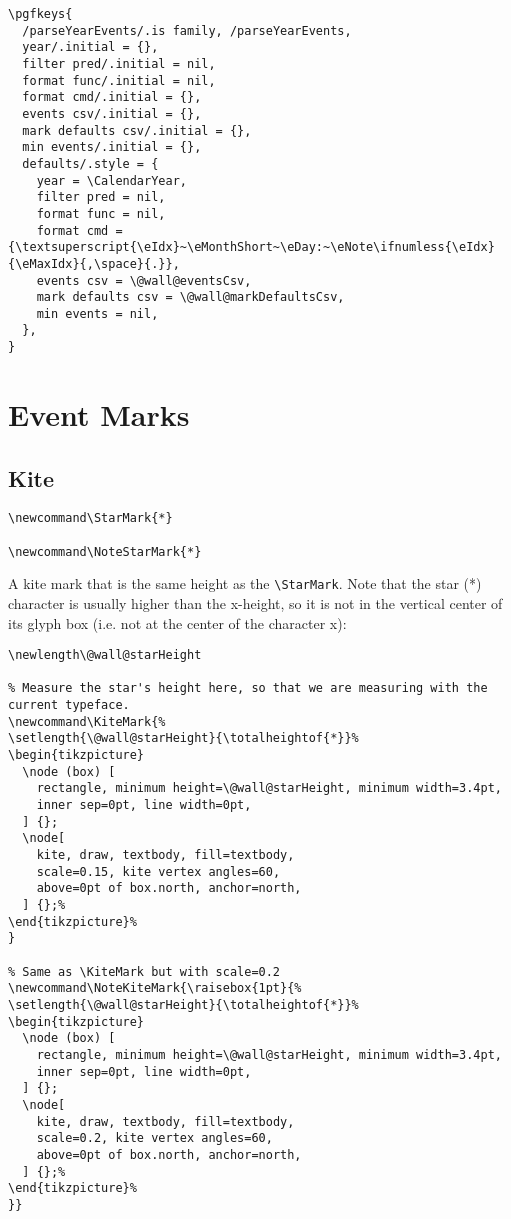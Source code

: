 \documentclass[11pt,oneside]{memoir-article}
\begin{document}
\begin{verbatim}
\pgfkeys{
  /parseYearEvents/.is family, /parseYearEvents,
  year/.initial = {},
  filter pred/.initial = nil,
  format func/.initial = nil,
  format cmd/.initial = {},
  events csv/.initial = {},
  mark defaults csv/.initial = {},
  min events/.initial = {},
  defaults/.style = {
    year = \CalendarYear,
    filter pred = nil,
    format func = nil,
    format cmd = {\textsuperscript{\eIdx}~\eMonthShort~\eDay:~\eNote\ifnumless{\eIdx}{\eMaxIdx}{,\space}{.}},
    events csv = \@wall@eventsCsv,
    mark defaults csv = \@wall@markDefaultsCsv,
    min events = nil,
  },
}
\end{verbatim}

\chapter{Event Marks}
\label{sec-8}
\section{Kite}
\label{sec-8-1}

\begin{verbatim}
\newcommand\StarMark{*}

\newcommand\NoteStarMark{*}
\end{verbatim}

A kite mark that is the same height as the \texttt{\textbackslash{}StarMark}. Note that the star (*)
character is usually higher than the x-height, so it is not in the vertical
center of its glyph box (i.e. not at the center of the character x):

 \frame{*}

\begin{verbatim}
\newlength\@wall@starHeight

% Measure the star's height here, so that we are measuring with the current typeface.
\newcommand\KiteMark{%
\setlength{\@wall@starHeight}{\totalheightof{*}}%
\begin{tikzpicture}
  \node (box) [
    rectangle, minimum height=\@wall@starHeight, minimum width=3.4pt,
    inner sep=0pt, line width=0pt,
  ] {};
  \node[
    kite, draw, textbody, fill=textbody,
    scale=0.15, kite vertex angles=60,
    above=0pt of box.north, anchor=north,
  ] {};%
\end{tikzpicture}%
}

% Same as \KiteMark but with scale=0.2
\newcommand\NoteKiteMark{\raisebox{1pt}{%
\setlength{\@wall@starHeight}{\totalheightof{*}}%
\begin{tikzpicture}
  \node (box) [
    rectangle, minimum height=\@wall@starHeight, minimum width=3.4pt,
    inner sep=0pt, line width=0pt,
  ] {};
  \node[
    kite, draw, textbody, fill=textbody,
    scale=0.2, kite vertex angles=60,
    above=0pt of box.north, anchor=north,
  ] {};%
\end{tikzpicture}%
}}
\end{verbatim}
\end{document}
